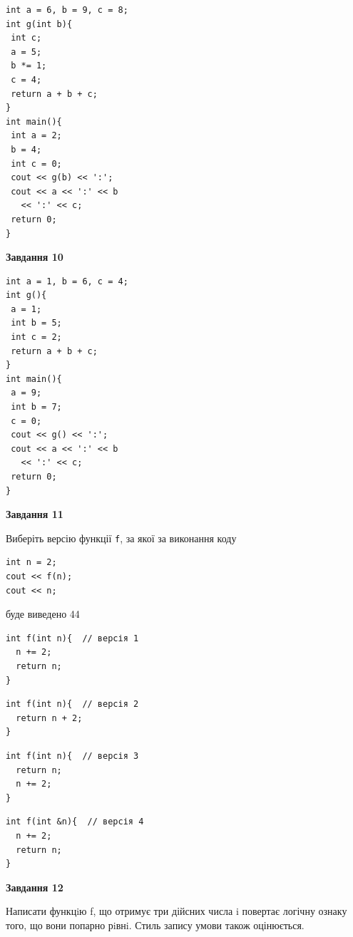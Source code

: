 \documentclass[12pt, ukrainian]{article}
\def\code#1{\Verb!#1!}
\begin{document}
{\begin {large}
\begin{minipage}[t]{7.0cm}
\begin{verbatim}
int a = 6, b = 9, c = 8;
int g(int b){
 int c;
 a = 5;
 b *= 1;
 c = 4;
 return a + b + c;
}
int main(){
 int a = 2;
 b = 4;
 int c = 0;
 cout << g(b) << ':';
 cout << a << ':' << b 
   << ':' << c;
 return 0;
}
\end{verbatim}



\begin{center}
\textbf{Завдання 10}
\end{center}
\vspace{-8mm}

\begin{verbatim}
int a = 1, b = 6, c = 4;
int g(){
 a = 1;
 int b = 5;
 int c = 2;
 return a + b + c;
}
int main(){
 a = 9;
 int b = 7;
 c = 0;
 cout << g() << ':';
 cout << a << ':' << b 
   << ':' << c;
 return 0;
}
\end{verbatim}

\end{minipage}
\vline \hspace{1mm}
\begin{minipage}[t]{11.0cm}

\begin{center}
\textbf{Завдання 11}
\end{center}
Виберіть версію функції \code{f}, за якої за виконання коду
\begin{verbatim}
int n = 2;
cout << f(n);
cout << n;
\end{verbatim}

буде виведено 44

\begin{verbatim}
int f(int n){  // версія 1
  n += 2;
  return n;
}
\end{verbatim}

\vspace{-8mm}\begin{verbatim}
int f(int n){  // версія 2
  return n + 2;
}
\end{verbatim}

\vspace{-8mm}\begin{verbatim}
int f(int n){  // версія 3
  return n;
  n += 2;
}
\end{verbatim}

\vspace{-8mm}\begin{verbatim}
int f(int &n){  // версія 4
  n += 2;
  return n;
}
\end{verbatim}



\begin{center}
\textbf{Завдання 12}
\end{center}

Написати функцiю f, що отримує три дійсних числа i повертає логічну ознаку того, що вони попарно рiвнi. Стиль запису умови також оцінюється.\par

\end{minipage}

\end {large}}
\newpage
\end{document}
